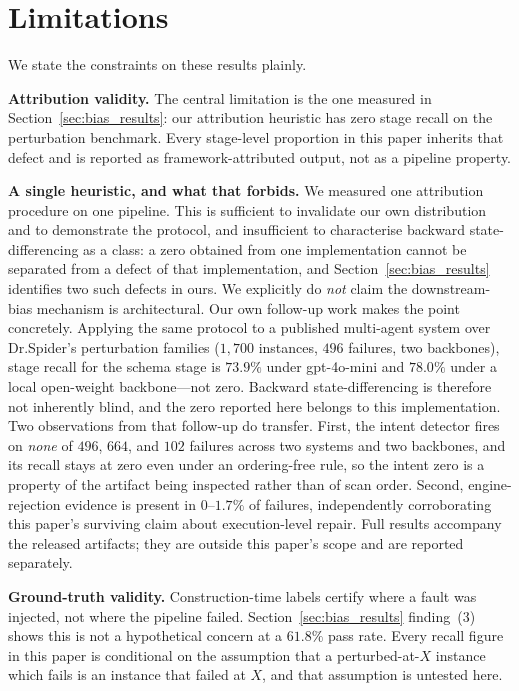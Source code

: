 \documentclass[conference]{IEEEtran}
\begin{document}
\section{Limitations}
\label{sec:limitations}

We state the constraints on these results plainly.

\noindent\textbf{Attribution validity.} The central limitation is the one
measured in Section~\ref{sec:bias_results}: our attribution heuristic has zero
stage recall on the perturbation benchmark. Every stage-level proportion in
this paper inherits that defect and is reported as framework-attributed
output, not as a pipeline property.

\noindent\textbf{A single heuristic, and what that forbids.} We measured one
attribution procedure on one pipeline. This is sufficient to invalidate our own
distribution and to demonstrate the protocol, and insufficient to characterise
backward state-differencing as a class: a zero obtained from one implementation
cannot be separated from a defect of that implementation, and
Section~\ref{sec:bias_results} identifies two such defects in ours. We
explicitly do \emph{not} claim the downstream-bias mechanism is architectural.
Our own follow-up work makes the point concretely. Applying the same protocol
to a published multi-agent system over Dr.Spider's perturbation families
($1{,}700$ instances, $496$ failures, two backbones), stage recall for the
schema stage is $73.9\%$ under gpt-4o-mini and $78.0\%$ under a local open-weight
backbone---not zero. Backward state-differencing is therefore not inherently
blind, and the zero reported here belongs to this implementation. Two
observations from that follow-up do transfer. First, the intent detector fires
on \emph{none} of $496$, $664$, and $102$ failures across two systems and two
backbones, and its recall stays at zero even under an ordering-free rule, so
the intent zero is a property of the artifact being inspected rather than of
scan order. Second, engine-rejection evidence is present in $0$--$1.7\%$ of
failures, independently corroborating this paper's surviving claim about
execution-level repair. Full results accompany the released artifacts; they are
outside this paper's scope and are reported separately.

\noindent\textbf{Ground-truth validity.} Construction-time labels certify where
a fault was injected, not where the pipeline failed. Section~\ref{sec:bias_results}
finding~(3) shows this is not a hypothetical concern at a $61.8\%$ pass rate.
Every recall figure in this paper is conditional on the assumption that a
perturbed-at-$X$ instance which fails is an instance that failed at $X$, and
that assumption is untested here.
\end{document}
